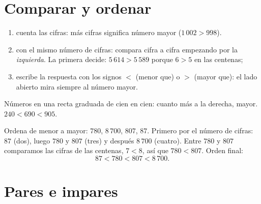 \section{Comparar y ordenar}

\begin{method}\label{met:g3:numbers:compare}
\begin{enumerate}
  \item cuenta las cifras: más cifras significa número mayor
        ($1\,002 > 998$).
  \item con el mismo número de cifras: compara cifra a cifra empezando por
        la \emph{izquierda}. La primera  decide:
        $5\,614 > 5\,589$ porque $6 > 5$ en las centenas;
  \item escribe la respuesta con los signos $<$ (menor que) o $>$
        (mayor que): el lado abierto mira siempre al número mayor.
\end{enumerate}
\end{method}

\begin{omfigure}

{\small Números en una recta graduada de cien en cien: cuanto más a la derecha,
mayor. $240 < 690 < 905$.}
\end{omfigure}

\begin{example}\label{ex:g3:numbers:order}
Ordena de menor a mayor: $780$, $8\,700$, $807$, $87$.
Primero por el número de cifras: $87$ (dos), luego $780$ y $807$
(tres) y después $8\,700$ (cuatro). Entre $780$ y $807$ comparamos las
cifras de las centenas, $7 < 8$, así que $780 < 807$. Orden final:
\[
87 < 780 < 807 < 8\,700 .
\]
\end{example}

\section{Pares e impares}

